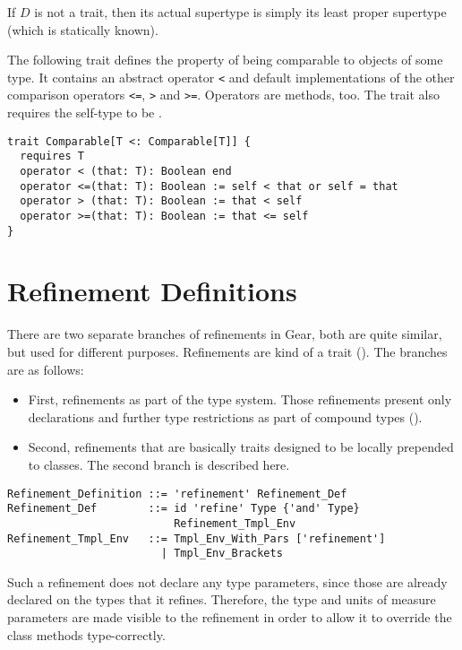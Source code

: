 If $D$ is not a trait, then its actual supertype is simply its least proper supertype (which is statically known). 

\example The following trait defines the property of being comparable to objects of some type. It contains an abstract operator \lstinline!<! and default implementations of the other comparison operators \lstinline!<=!, \lstinline!>! and \lstinline!>=!. Operators are methods, too. The trait also requires the self-type to be . 
\begin{lstlisting}
trait Comparable[T <: Comparable[T]] {
  requires T
  operator < (that: T): Boolean end
  operator <=(that: T): Boolean := self < that or self = that
  operator > (that: T): Boolean := that < self
  operator >=(that: T): Boolean := that <= self
}
\end{lstlisting}






\section{Refinement Definitions}
\label{sec:refinements}

There are two separate branches of refinements in Gear, both are quite similar, but used for different purposes. Refinements are kind of a trait (). The branches are as follows:
\begin{itemize}
  \item[] First, refinements as part of the type system. Those refinements present only declarations and further type restrictions as part of compound types ().

  \item[] Second, refinements that are basically traits designed to be locally prepended to classes. The second branch is described here. 
\end{itemize}

\syntax\begin{lstlisting}
Refinement_Definition ::= 'refinement' Refinement_Def
Refinement_Def        ::= id 'refine' Type {'and' Type} 
                          Refinement_Tmpl_Env
Refinement_Tmpl_Env   ::= Tmpl_Env_With_Pars ['refinement']
                        | Tmpl_Env_Brackets
\end{lstlisting}

Such a refinement does not declare any type parameters, since those are already declared on the types that it refines. Therefore, the type and units of measure parameters are made visible to the refinement in order to allow it to override the class methods type-correctly. 


